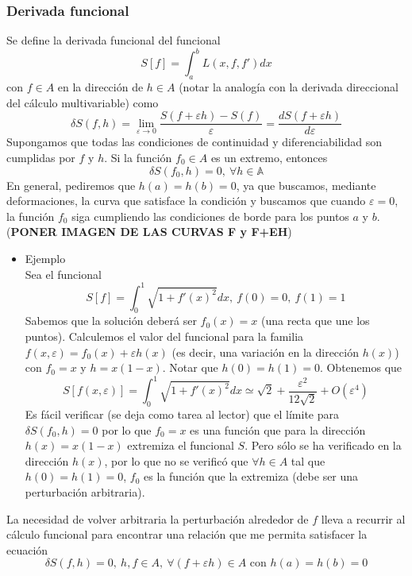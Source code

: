 \documentclass[12pt]{report}
\begin{document}
\subsubsection{Derivada funcional}
Se define la derivada funcional del funcional
\begin{equation}
S[f]=\int_{a}^{b}L(x,f,f')dx
\end{equation} 
con $f\in\mathit{A}$ en la dirección de $h\in\mathit{A}$ (notar la analogía con la derivada direccional del cálculo multivariable) como
\begin{equation}
\delta S(f,h)=\lim_{\varepsilon\rightarrow 0}\frac{S(f+\varepsilon h)-S(f)}{\varepsilon}=\frac{d S(f+\varepsilon h)}{d\varepsilon}
\end{equation}
Supongamos que todas las condiciones de continuidad y diferenciabilidad son cumplidas por $f$ y $h$. Si la función $f_0\in\mathit{A}$ es un extremo, entonces
\begin{equation}
\delta S(f_0,h)=0,\ \forall h\in\mathbb{A}
\end{equation}
En general, pediremos que $h(a)=h(b)=0$, ya que buscamos, mediante deformaciones, la curva que satisface la condición y buscamos que cuando $\varepsilon=0$, la función $f_0$ siga cumpliendo las condiciones de borde para los puntos $a$ y $b$. (\textbf{PONER IMAGEN DE LAS CURVAS F y F+EH})
\begin{itemize}
\item Ejemplo \\
Sea el funcional
\begin{equation}
S[f]=\int_0^1\sqrt{1+f'(x)^2}dx,\ f(0)=0,\ f(1)=1
\end{equation}
Sabemos que la solución deberá ser $f_0(x)=x$ (una recta que une los puntos). Calculemos el valor del funcional para la familia $f(x,\varepsilon)=f_0(x)+\varepsilon h(x)$ (es decir, una variación en la dirección $h(x)$) con $f_0=x$ y $h=x(1-x)$. Notar que $h(0)=h(1)=0$. Obtenemos que
\begin{equation}
S[f(x,\varepsilon)]=\int_0^1\sqrt{1+f'(x)^2}dx\simeq\sqrt{2}+\frac{\varepsilon^2}{12\sqrt{2}}+\mathit{O}(\varepsilon^4)
\end{equation}
Es fácil verificar (se deja como tarea al lector) que el límite para $\delta S(f_0,h)=0$ por lo que $f_0=x$ es una función que para la dirección $h(x)=x(1-x)$ extremiza el funcional $S$. Pero sólo se ha verificado en la dirección $h(x)$, por lo que no se verificó que $\forall h\in\mathit{A}$ tal que $h(0)=h(1)=0$, $f_0$ es la función que la extremiza (debe ser una perturbación arbitraria).
\end{itemize}
La necesidad de volver arbitraria la perturbación alrededor de $f$ lleva a recurrir al cálculo funcional para encontrar una relación que me permita satisfacer la ecuación
\begin{equation}
\delta S(f,h)=0,\ h,f\in\mathit{A},\ \forall(f+\varepsilon h)\in\mathit{A}\text{ con }h(a)=h(b)=0
\end{equation}
\end{document}
